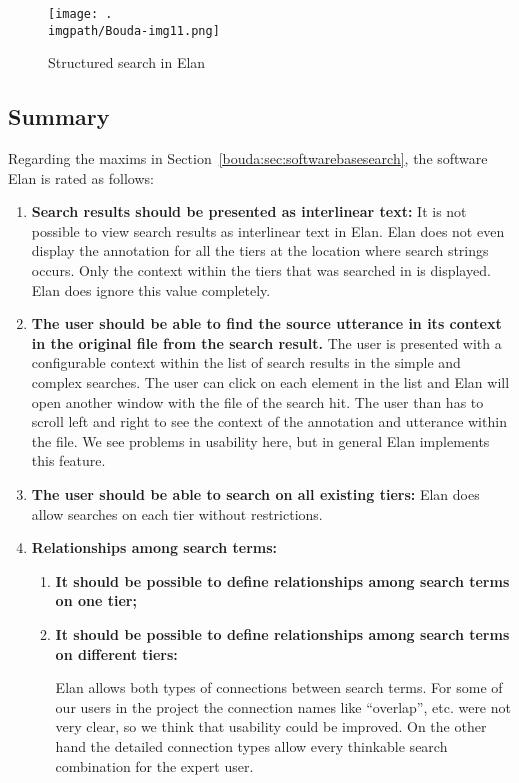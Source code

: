 \begin{figure}
 \texttt{[image: .\\imgpath/Bouda-img11.png]}
 \caption{Structured search in Elan}
\label{bouda:fig:structuredsearch}
\end{figure}

\subsection{Summary}
\label{bkm:Ref296713597}

Regarding the maxims in Section\ \ref{bouda:sec:softwarebasesearch}, the software Elan is rated as follows:

\begin{enumerate}
\item \textbf{Search results should be presented as interlinear text:}
It is not possible to view search results as interlinear text in Elan. Elan does not even display the annotation for all the tiers at the location where search strings occurs. Only the context within the tiers that was searched in is displayed. Elan does ignore this value completely.

\item \textbf{The user should be able to find the source utterance in its context in the original file from the search result.} 
The user is presented with a configurable context within the list of search results in the simple and complex searches. The user can click on each element in the list and Elan will open another window with the file of the search hit. The user than has to scroll left and right to see the context of the annotation and utterance within the file. We see problems in usability here, but in general Elan implements this feature.

\item \textbf{The user should be able to search on all existing tiers:}
Elan does allow searches on each tier without restrictions.
\item \textbf{Relationships among search terms:}

 \begin{enumerate}
 \item \textbf{It should be possible to define relationships among search terms on one tier;}
 \item \textbf{It should be possible to define relationships among search terms on different tiers:}

 Elan allows both types of connections between search terms. For some of our users in the project the connection names like ``overlap{\textquotedblright}, etc. were not very clear, so we think that usability could be improved. On the other hand the detailed connection types allow every thinkable search combination for the expert user.
 \end{enumerate}


\end{enumerate}
